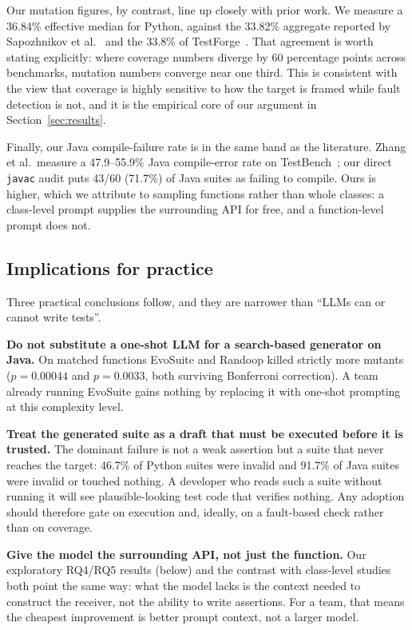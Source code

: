 Our mutation figures, by contrast, line up closely with prior work. We measure a 36.84\%
effective median for Python, against the 33.82\% aggregate reported by Sapozhnikov et
al.~\cite{sapozhnikov2024empirical} and the 33.8\% of TestForge~\cite{jain2025testgeneval}.
That agreement is worth stating explicitly: where coverage numbers diverge by 60 percentage
points across benchmarks, mutation numbers converge near one third. This is consistent with
the view that coverage is highly sensitive to how the target is framed while fault detection
is not, and it is the empirical core of our argument in Section~\ref{sec:results}.

Finally, our Java compile-failure rate is in the same band as the literature. Zhang et al.\
measure a 47.9--55.9\% Java compile-error rate on TestBench~\cite{zhang2024testbench}; our
direct \texttt{javac} audit puts 43/60 (71.7\%) of Java suites as failing to compile. Ours is
higher, which we attribute to sampling functions rather than whole classes: a class-level
prompt supplies the surrounding API for free, and a function-level prompt does not.

\subsection{Implications for practice}
Three practical conclusions follow, and they are narrower than ``LLMs can or cannot write
tests''.

\textbf{Do not substitute a one-shot LLM for a search-based generator on Java.} On matched
functions EvoSuite and Randoop killed strictly more mutants ($p=0.00044$ and $p=0.0033$, both
surviving Bonferroni correction). A team already running EvoSuite gains nothing by replacing
it with one-shot prompting at this complexity level.

\textbf{Treat the generated suite as a draft that must be executed before it is trusted.}
The dominant failure is not a weak assertion but a suite that never reaches the target: 46.7\%
of Python suites were invalid and 91.7\% of Java suites were invalid or touched nothing. A
developer who reads such a suite without running it will see plausible-looking test code that
verifies nothing. Any adoption should therefore gate on execution and, ideally, on a
fault-based check rather than on coverage.

\textbf{Give the model the surrounding API, not just the function.} Our exploratory RQ4/RQ5
results (below) and the contrast with class-level studies both point the same way: what the
model lacks is the context needed to construct the receiver, not the ability to write
assertions. For a team, that means the cheapest improvement is better prompt context, not a
larger model.

